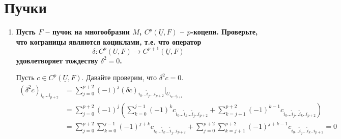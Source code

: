 \documentclass{article}
\begin{document}
\section{Пучки}
\begin{enumerate}
    \item \textbf{Пусть $F$ – пучок на многообразии $M$, $C^p(\underline U,F)$ –
        $p$-коцепи. Проверьте, что кограницы являются коциклами, т.е. что оператор
        \[\delta:C^p(U,F)→C^{p+1}(\underline U,F)\]
        удовлетворяет тождеству $\delta^2=0$.}

    Пусть $c\in C^p(\underline U,F)$. Давайте проверим, что $\delta^2c=0$.
    \begin{align*}
        (\delta^2 c)_{i_0...i_{p+2}}&=\sum_{j=0}^{p+2}(-1)^j(\delta c)_{i_0...\hat i_j...i_{p+2}}|_{U_{i_0...i_{p+2}}}\\
        &=\sum_{j=0}^{p+2}(-1)^j\left(\sum_{k=0}^{j-1}(-1)^kc_{i_0...\hat i_k...\hat i_j..i_{p+2}}+
        \sum_{k=j+1}^{p+2}(-1)^{k-1}c_{i_0...\hat i_j...\hat i_k..i_{p+2}}\right)\\
        &=\sum_{j=0}^{p+2}\sum_{k=0}^{j-1}(-1)^{j+k}c_{i_0...\hat i_k...\hat i_j..i_{p+2}}+
        \sum_{j=0}^{p+2}\sum_{k=j+1}^{p+2}(-1)^{j+k-1}c_{i_0...\hat i_j...\hat i_k..i_{p+2}}=0
    \end{align*}
\end{enumerate}
\end{document}
